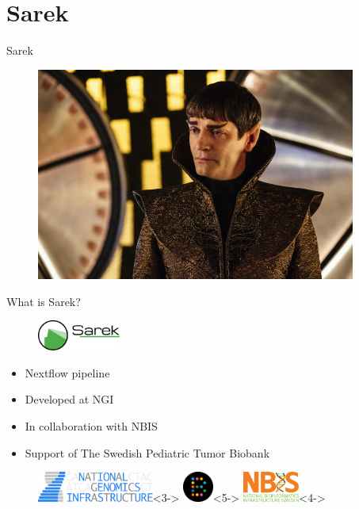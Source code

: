 \documentclass{beamer}
\begin{document}
\section{Sarek}

\begin{frame}{Sarek}
	\begin{figure}
		\includegraphics[height=7cm]{pictures/Sarek_discovery.jpg}
	\end{figure}
\end{frame}

\begin{frame}{What is Sarek?}
	\vfill
	\begin{figure}
		\includegraphics[height=1cm]{pictures/Sarek_no_border}
	\end{figure}
	\begin{itemize}
		\pause
		\item Nextflow pipeline
		\item<3-> Developed at NGI
		\item<4-> In collaboration with NBIS
		\item<5-> Support of The Swedish Pediatric Tumor Biobank
	\end{itemize}
	\begin{figure}
		\includegraphics[height=1cm]{pictures/NGI}<3->
		\only<3->{\hfill}
		\includegraphics[height=1cm]{pictures/Barntumorbanken}<5->
		\only<4->{\hfill}
		\includegraphics[height=1cm]{pictures/NBIS}<4->
	\end{figure}
	\vfill
\end{frame}
\end{document}
